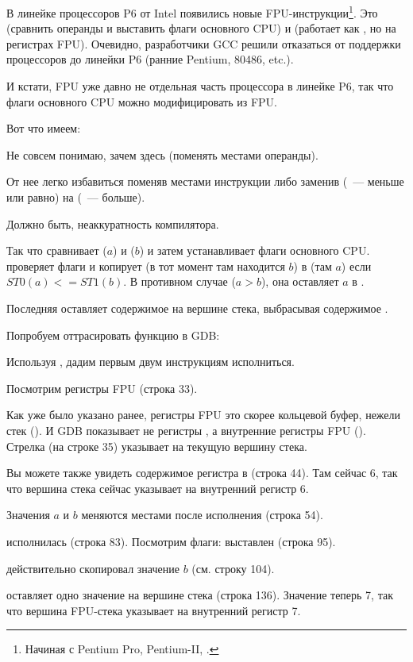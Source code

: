 \label{gcc481_o3}

В линейке процессоров P6 от Intel 
появились новые FPU-инструкции\footnote{Начиная с Pentium Pro, Pentium-II, \etc.}.
Это  (сравнить операнды и выставить флаги основного CPU) и
 (работает как , но на регистрах FPU).
Очевидно, разработчики GCC решили отказаться от поддержки процессоров до линейки P6 (ранние Pentium, 80486, etc{}.).

И кстати, FPU уже давно не отдельная часть процессора в линейке P6, так что флаги основного CPU можно модифицировать из FPU.

Вот что имеем:



Не совсем понимаю, зачем здесь  (поменять местами операнды).

От нее легко избавиться поменяв местами инструкции \FLD либо заменив 
 (~--- меньше или равно) на 
 (~--- больше).

Должно быть, неаккуратность компилятора.

Так что  сравнивает  ($a$) и  ($b$) 
и затем устанавливает флаги основного CPU.
 проверяет флаги и копирует  
(в тот момент там находится $b$) в 
 (там $a$) если $ST0 (a) <= ST1 (b)$.
В противном случае ($a>b$), она оставляет $a$ в .

Последняя \FSTP оставляет содержимое  на вершине стека, выбрасывая содержимое .

Попробуем оттрасировать функцию в GDB:



Используя , дадим первым двум инструкциям \FLD исполниться.

Посмотрим регистры FPU (строка 33).

Как уже было указано ранее, регистры FPU это скорее кольцевой буфер, нежели стек ().
И GDB показывает не регистры , а внутренние регистры FPU (). 
Стрелка (на строке 35) указывает на текущую вершину стека.

Вы можете также увидеть содержимое регистра  в  (строка 44). Там сейчас 6, так что
вершина стека сейчас указывает на внутренний регистр 6.

Значения $a$ и $b$ меняются местами после исполнения  (строка 54).

 исполнилась (строка 83).
Посмотрим флаги: \CF выставлен (строка 95).

 действительно скопировал значение $b$ (см. строку 104).

\FSTP оставляет одно значение на вершине стека (строка 136). 
Значение  теперь 7, так что вершина FPU-стека указывает на внутренний регистр 7.
